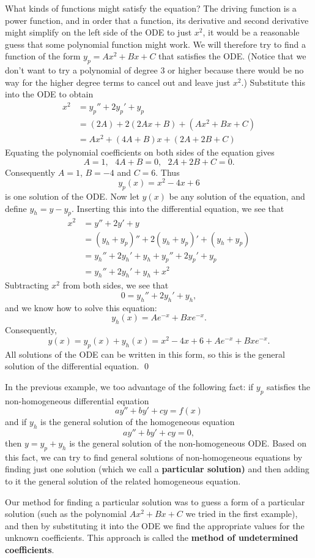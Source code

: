 \documentclass[12pt,letterpaper,twoside]{amsart}
\newcounter{example}
\begin{document}
What kinds of functions might satisfy the equation?  The driving function is a power function, and in order that a function, its derivative and second derivative might simplify on the left side of the ODE to just $x^2$, it would be a reasonable guess that some polynomial function might work.  We will therefore try to find a function of the form $y_p=Ax^2+Bx+C$ that satisfies the ODE.  (Notice that we don't want to try a polynomial of degree 3 or higher because there would be no way for the higher degree terms to cancel out and leave just $x^2$.)  Substitute this into the ODE to obtain
\begin{align*}
x^2 & = y_p''+2y_p'+y_p \\
& = (2A)+2(2Ax+B)+(Ax^2+Bx+C) \\
& = Ax^2 + (4A+B)x+(2A+2B+C)
\end{align*}
Equating the polynomial coefficients on both sides of the equation gives
\[ A=1, \ \ \ 4A+B=0, \ \ \ 2A+2B+C=0.\]
Consequently $A=1$, $B=-4$ and $C=6$.  Thus
\[ y_p (x) = x^2-4x+6\]
is one solution of the ODE.  Now let $y(x)$ be any solution of the equation, and define $y_h=y-y_p$.  Inserting this into the differential equation, we see that
\begin{align*}
x^2 & = y''+2y'+y \\
& = (y_h+y_p)''+2(y_h+y_p)'+(y_h+y_p) \\
& = y_h''+2y_h'+y_h + y_p''+2y_p'+y_p \\
& = y_h''+2y_h'+y_h + x^2
\end{align*}
Subtracting $x^2$ from both sides, we see that
\[ 0 = y_h''+2y_h'+y_h,\]
and we know how to solve this equation:
\[ y_h(x)=Ae^{-x}+Bxe^{-x}.\]
Consequently,
\[ y(x)=y_p(x)+y_h(x) =x^2-4x+6+Ae^{-x}+Bxe^{-x}.\]
All solutions of the ODE can be written in this form, so this is the general solution of the differential equation.
\qed

In the previous example, we too advantage of the following fact: if $y_p$ satisfies the non-homogeneous differential equation
\[ ay''+by'+cy=f(x)\]
and if $y_h$ is the general solution of the homogeneous equation
\[ ay''+by'+cy=0,\]
then $y=y_p+y_h$ is the general solution of the non-homogeneous ODE.  Based on this fact, we can try to find general solutions of non-homogeneous equations by finding just one solution (which we call a {\bf particular solution)} and then adding to it the general solution of the related homogeneous equation.

Our method for finding a particular solution was to guess a form of a particular solution (such as the polynomial $Ax^2+Bx+C$ we tried in the first example), and then by substituting it into the ODE we find the appropriate values for the unknown coefficients.  This approach is called the {\bf method of undetermined coefficients}.
\end{document}
